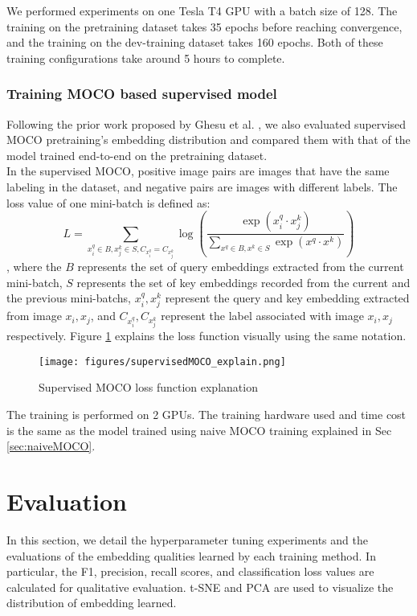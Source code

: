 \documentclass[12pt,twoside]{report}
\begin{document}
We performed experiments on one Tesla T4 GPU with a batch size of 128. The training on the pretraining dataset takes 35 epochs before reaching convergence, and the training on the dev-training dataset takes 160 epochs. Both of these training configurations take around 5 hours to complete. 

\subsection{Training MOCO based supervised model}
Following the prior work proposed by Ghesu et al. \cite{selfsupervisedlearningfrom100}, we also evaluated supervised MOCO pretraining's embedding distribution and compared them with that of the model trained end-to-end on the pretraining dataset.\\

In the supervised MOCO, positive image pairs are images that have the same labeling in the dataset, and negative pairs are images with different labels. The loss value of one mini-batch is defined as:
$$L = \sum_{x_i^q \in B, x_j^k \in S, C_{x_i^q} = C_{x_j^k}}\log(\frac{\exp(x_i^q \cdot x_j^k)}{\sum_{x^q \in B, x^k \in S}\exp(x^q \cdot x^k)})$$
, where the $B$ represents the set of query embeddings extracted from the current mini-batch, $S$ represents the set of key embeddings recorded from the current and the previous mini-batchs, $x_i^q, x_j^k$ represent the query and key embedding extracted from image $x_i, x_j$, and $C_{x_i^q}, C_{x_j^k}$ represent the label associated with image $x_i, x_j$ respectively. Figure \ref{fig:supervisedMOCO_loss_explain} explains the loss function visually using the same notation.\\

\begin{figure}
    \centering
    \texttt{[image: figures/supervisedMOCO\_explain.png]}
    \caption{Supervised MOCO loss function explanation}
    \label{fig:supervisedMOCO_loss_explain}
\end{figure}

The training is performed on 2 GPUs. The training hardware used and time cost is the same as the model trained using naive MOCO training explained in Sec \ref{sec:naiveMOCO}. 

\chapter{Evaluation}
In this section, we detail the hyperparameter tuning experiments and the evaluations of the embedding qualities learned by each training method. In particular, the F1, precision, recall scores, and classification loss values are calculated for qualitative evaluation. t-SNE and PCA are used to visualize the distribution of embedding learned. \\
\end{document}
